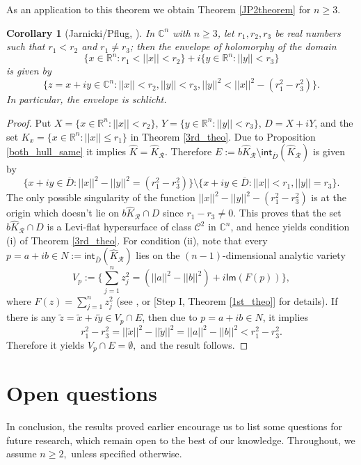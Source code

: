 \documentclass[12pt,reqno, a4paper]{amsart}
\newtheorem{corollary}[theorem]{Corollary}
\theoremstyle{definition}
\theoremstyle{definition}
\numberwithin{equation}{section}
\def\R{\mathbb{R}}                              %
\def\C{\mathbb{C}}                              %
\begin{document}
As an application to this theorem we obtain Theorem \ref{JP2theorem} for $n\geq 3$.
\begin{corollary}[Jarnicki/Pflug, \cite{JP2}]\label{jp_corollary_2norm}
	In $\C^n$ with $n\geq 3$, let $r_1,r_2, r_3$ be real numbers such that $r_1<r_2$ and $r_1\neq r_3$; then the envelope of holomorphy of the domain $$\{x \in \R^n: r_1<||x||<r_2\}+i\{y\in \R^n:||y||<r_3\}$$ is given by $$\{z=x+iy\in \C^n: ||x||<r_2, ||y||<r_3,  ||y||^2<||x||^2-(r_1^2-r_3^2)\}.$$ In particular, the envelope is schlicht.
\end{corollary}	
\begin{proof}
Put $X=\{x\in \R^n: ||x||<r_2\}$, $Y=\{y\in \R^n: ||y||<r_3\}$, $D=X+iY$, and the set ${K_x=\{x\in \R^n: ||x||\leq r_1\}}$ in Theorem \ref{3rd_theo}. 
Due to Proposition \ref{both_hull_same} it implies $\widehat{K}=\widehat{K}_{\mathcal{R}}.$ Therefore $E:=b\widehat{K}_{\mathcal{R}}\setminus \textsf{int}_{\overline{D}}(\widehat{K}_{\mathcal{R}})$ is given by
$$\{x+iy\in \overline{D}:||x||^2-||y||^2= (r_1^2-r_3^2)\}\setminus \{x+iy\in \overline{D}:||x||<r_1, ||y||=r_3\}.$$ The only possible  singularity of the function ${||x||^2-||y||^2-(r_1^2-r_3^2)}$ is at the origin which doesn't lie on $b\widehat{K}_{\mathcal{R}}\cap D$ since $r_1- r_3\neq0$. This proves that the set $b\widehat{K}_{\mathcal{R}}\cap D$ is a Levi-flat hypersurface of class $\mathcal{C}^2$ in $\C^n$, and hence yields condition (i) of Theorem \ref{3rd_theo}. For condition (ii), note that every $p=a+ib\in N:= \textsf{int}_{\overline{D}}(\widehat{K}_{\mathcal{R}})$ lies on the $(n-1)$-dimensional analytic variety $$V_{p}:=\Big\{\sum_{j=1}^{n}z_j^2=(||a||^2-||b||^2)+i\textsf{Im}(F(p))\Big\},$$ where $F(z)=\sum_{j=1}^{n}z_j^2$ (see \cite[Example 4.4.(a)]{haz-por}, or [Step I, Theorem \ref{1st_theo}] for details). If there is any $\tilde{z}=\tilde{x}+i\tilde{y}\in V_{p}\cap E$, then due to $p=a+ib\in N$, it implies
$$r_1^2-r_3^2=||\tilde{x}||^2-||\tilde{y}||^2=||a||^2-||b||^2<r_1^2-r_3^2.$$Therefore it yields $V_{p}\cap E=\emptyset,$ and the result follows.
\end{proof}



\section{Open questions}\label{sec_7}

In conclusion, the results proved earlier encourage us to list some questions for future research, which remain open to the best of our knowledge. Throughout, we assume $n\geq 2,$ unless specified otherwise.
\end{document}
